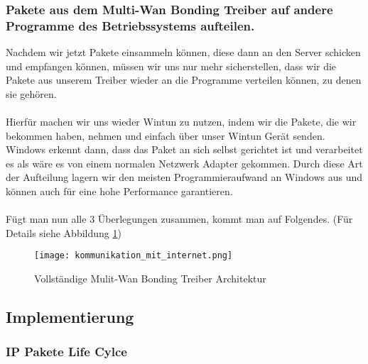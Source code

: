\subsubsection{Pakete aus dem Multi-Wan Bonding Treiber auf andere Programme des Betriebssystems aufteilen.}
Nachdem wir jetzt Pakete einsammeln können, diese dann an den Server schicken und empfangen können, müssen wir uns nur mehr sicherstellen, dass wir die Pakete aus unserem Treiber wieder an die Programme verteilen können, zu denen sie gehören.
\\\\
Hierfür machen wir uns wieder Wintun zu nutzen, indem wir die Pakete, die wir bekommen haben, nehmen und einfach über unser Wintun Gerät senden. Windows erkennt dann, dass das Paket an sich selbst gerichtet ist und verarbeitet es als wäre es von einem normalen Netzwerk Adapter gekommen. Durch diese Art der Aufteilung lagern wir den meisten Programmieraufwand an Windows aus und können auch für eine hohe Performance garantieren.
\\\\
Fügt man nun alle 3 Überlegungen zusammen, kommt man auf Folgendes. (Für Details siehe Abbildung \ref{driver-full-architecture})
\begin{figure}[H]
    \centering
    \texttt{[image: kommunikation\_mit\_internet.png]}
    \caption[Vollständige Mulit-Wan Bonding Treiber Architektur]{Vollständige Mulit-Wan Bonding Treiber Architektur}
    \label{driver-full-architecture}
\end{figure}
\noindent

\newpage
\subsection{Implementierung}
\subsubsection{IP Pakete Life Cylce}
